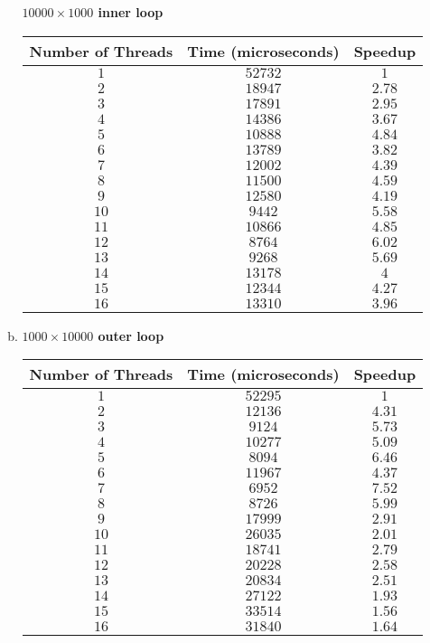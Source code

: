 \documentclass[10pt]{article} %
\begin{document}
\begin{enumerate}[1.]
\begin{enumerate}[(a)]
\textbf{$10000 \times 1000$ inner loop}
\begin{center}
\begin{tabular}{| c | c | c |}
\hline
Number of Threads & Time (microseconds) & Speedup \\
\hline
$1$ & $52732$ & $1$ \\
$2$ & $18947$ & $2.78$ \\
$3$ & $17891$ & $2.95$ \\
$4$ & $14386$ & $3.67$ \\
$5$ & $10888$ & $4.84$ \\
$6$ & $13789$ & $3.82$ \\
$7$ & $12002$ & $4.39$ \\
$8$ & $11500$ & $4.59$ \\
$9$ & $12580$ & $4.19$ \\
$10$ & $9442$ & $5.58$ \\
$11$ & $10866$ & $4.85$ \\
$12$ & $8764$ & $6.02$ \\
$13$ & $9268$ & $5.69$ \\
$14$ & $13178$ & $4$ \\
$15$ & $12344$ & $4.27$ \\
$16$ & $13310$ & $3.96$ \\
\hline
\end{tabular}
\end{center}

\item %

\textbf{$1000 \times 10000$ outer loop}
\begin{center}
\begin{tabular}{| c | c | c |}
\hline
Number of Threads & Time (microseconds) & Speedup \\
\hline
$1$ & $52295$ & $1$ \\
$2$ & $12136$ & $4.31$ \\
$3$ & $9124$ & $5.73$ \\
$4$ & $10277$ & $5.09$ \\
$5$ & $8094$ & $6.46$ \\
$6$ & $11967$ & $4.37$ \\
$7$ & $6952$ & $7.52$ \\
$8$ & $8726$ & $5.99$ \\
$9$ & $17999$ & $2.91$ \\
$10$ & $26035$ & $2.01$ \\
$11$ & $18741$ & $2.79$ \\
$12$ & $20228$ & $2.58$ \\
$13$ & $20834$ & $2.51$ \\
$14$ & $27122$ & $1.93$ \\
$15$ & $33514$ & $1.56$ \\
$16$ & $31840$ & $1.64$ \\
\hline
\end{tabular}
\end{center}


\end{enumerate}
\end{enumerate}
\end{document}
